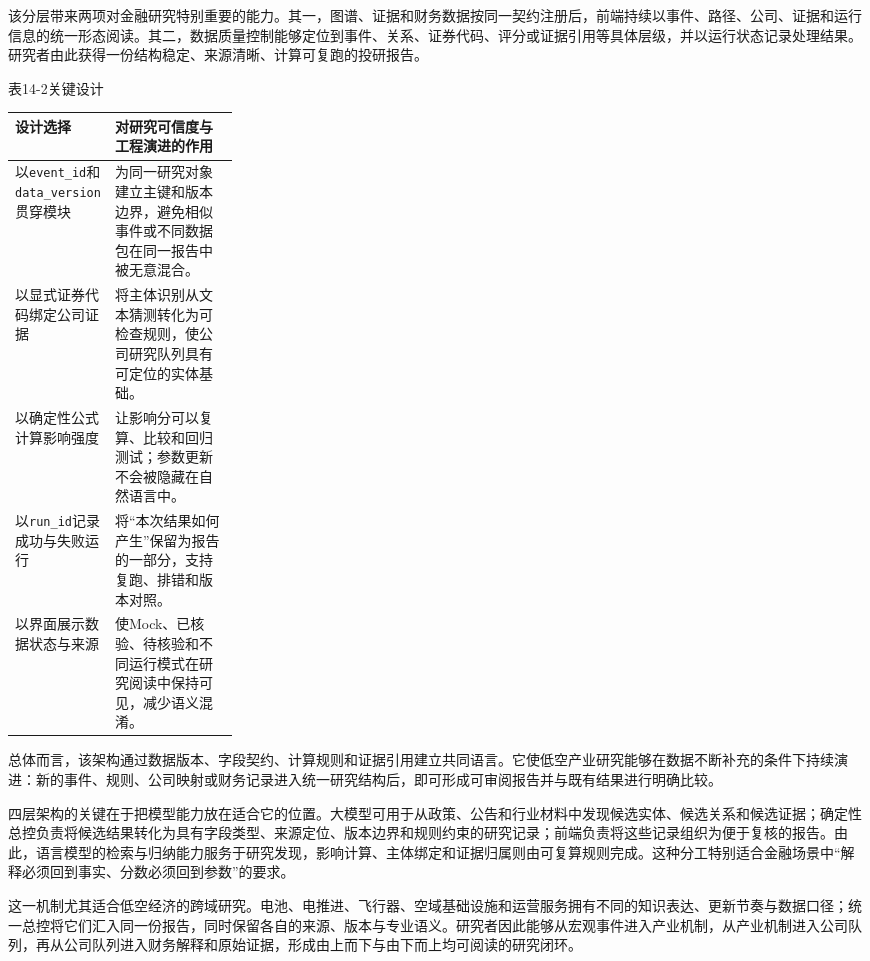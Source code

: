 该分层带来两项对金融研究特别重要的能力。其一，图谱、证据和财务数据按同一契约注册后，前端持续以事件、路径、公司、证据和运行信息的统一形态阅读。其二，数据质量控制能够定位到事件、关系、证券代码、评分或证据引用等具体层级，并以运行状态记录处理结果。研究者由此获得一份结构稳定、来源清晰、计算可复跑的投研报告。

\begin{center}\small 表14-2\quad 关键设计\par\vspace{1mm}
\begin{tabularx}{\linewidth}{p{0.26\linewidth}X}
\toprule
设计选择 & 对研究可信度与工程演进的作用\\
\midrule
以\texttt{event\_id}和\texttt{data\_version}贯穿模块 & 为同一研究对象建立主键和版本边界，避免相似事件或不同数据包在同一报告中被无意混合。\\
以显式证券代码绑定公司证据 & 将主体识别从文本猜测转化为可检查规则，使公司研究队列具有可定位的实体基础。\\
以确定性公式计算影响强度 & 让影响分可以复算、比较和回归测试；参数更新不会被隐藏在自然语言中。\\
以\texttt{run\_id}记录成功与失败运行 & 将“本次结果如何产生”保留为报告的一部分，支持复跑、排错和版本对照。\\
以界面展示数据状态与来源 & 使Mock、已核验、待核验和不同运行模式在研究阅读中保持可见，减少语义混淆。\\
\bottomrule
\end{tabularx}\end{center}

总体而言，该架构通过数据版本、字段契约、计算规则和证据引用建立共同语言。它使低空产业研究能够在数据不断补充的条件下持续演进：新的事件、规则、公司映射或财务记录进入统一研究结构后，即可形成可审阅报告并与既有结果进行明确比较。

四层架构的关键在于把模型能力放在适合它的位置。大模型可用于从政策、公告和行业材料中发现候选实体、候选关系和候选证据；确定性总控负责将候选结果转化为具有字段类型、来源定位、版本边界和规则约束的研究记录；前端负责将这些记录组织为便于复核的报告。由此，语言模型的检索与归纳能力服务于研究发现，影响计算、主体绑定和证据归属则由可复算规则完成。这种分工特别适合金融场景中“解释必须回到事实、分数必须回到参数”的要求。

这一机制尤其适合低空经济的跨域研究。电池、电推进、飞行器、空域基础设施和运营服务拥有不同的知识表达、更新节奏与数据口径；统一总控将它们汇入同一份报告，同时保留各自的来源、版本与专业语义。研究者因此能够从宏观事件进入产业机制，从产业机制进入公司队列，再从公司队列进入财务解释和原始证据，形成由上而下与由下而上均可阅读的研究闭环。


